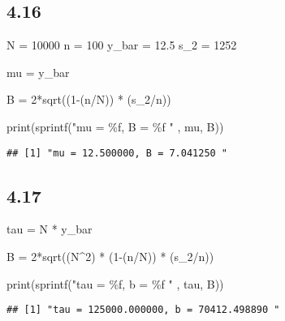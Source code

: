 \documentclass[
]{article}
\newenvironment{Shaded}{\begin{snugshade}}{\end{snugshade}}
\newcommand{\DecValTok}[1]{\textcolor[rgb]{0.00,0.00,0.81}{#1}}
\newcommand{\FloatTok}[1]{\textcolor[rgb]{0.00,0.00,0.81}{#1}}
\newcommand{\FunctionTok}[1]{\textcolor[rgb]{0.00,0.00,0.00}{#1}}
\newcommand{\NormalTok}[1]{#1}
\newcommand{\OtherTok}[1]{\textcolor[rgb]{0.56,0.35,0.01}{#1}}
\newcommand{\SpecialCharTok}[1]{\textcolor[rgb]{0.00,0.00,0.00}{#1}}
\newcommand{\StringTok}[1]{\textcolor[rgb]{0.31,0.60,0.02}{#1}}
\begin{document}
\hypertarget{section-4}{%
\subsection{4.16}\label{section-4}}

\begin{Shaded}
\begin{Highlighting}[]
\NormalTok{N }\OtherTok{=} \DecValTok{10000}
\NormalTok{n }\OtherTok{=} \DecValTok{100}
\NormalTok{y\_bar }\OtherTok{=} \FloatTok{12.5}
\NormalTok{s\_2 }\OtherTok{=} \DecValTok{1252}

\NormalTok{mu }\OtherTok{=}\NormalTok{ y\_bar}

\NormalTok{B }\OtherTok{=} \DecValTok{2}\SpecialCharTok{*}\FunctionTok{sqrt}\NormalTok{((}\DecValTok{1}\SpecialCharTok{{-}}\NormalTok{(n}\SpecialCharTok{/}\NormalTok{N)) }\SpecialCharTok{*}\NormalTok{ (s\_2}\SpecialCharTok{/}\NormalTok{n))}

\FunctionTok{print}\NormalTok{(}\FunctionTok{sprintf}\NormalTok{(}\StringTok{"mu = \%f, B = \%f "}\NormalTok{ , mu, B))}
\end{Highlighting}
\end{Shaded}

\begin{verbatim}
## [1] "mu = 12.500000, B = 7.041250 "
\end{verbatim}

\hypertarget{section-5}{%
\subsection{4.17}\label{section-5}}

\begin{Shaded}
\begin{Highlighting}[]
\NormalTok{tau }\OtherTok{=}\NormalTok{ N }\SpecialCharTok{*}\NormalTok{ y\_bar}

\NormalTok{B }\OtherTok{=} \DecValTok{2}\SpecialCharTok{*}\FunctionTok{sqrt}\NormalTok{((N}\SpecialCharTok{\^{}}\DecValTok{2}\NormalTok{) }\SpecialCharTok{*}\NormalTok{ (}\DecValTok{1}\SpecialCharTok{{-}}\NormalTok{(n}\SpecialCharTok{/}\NormalTok{N)) }\SpecialCharTok{*}\NormalTok{ (s\_2}\SpecialCharTok{/}\NormalTok{n))}

\FunctionTok{print}\NormalTok{(}\FunctionTok{sprintf}\NormalTok{(}\StringTok{"tau = \%f, b = \%f "}\NormalTok{ , tau, B))}
\end{Highlighting}
\end{Shaded}

\begin{verbatim}
## [1] "tau = 125000.000000, b = 70412.498890 "
\end{verbatim}
\end{document}
